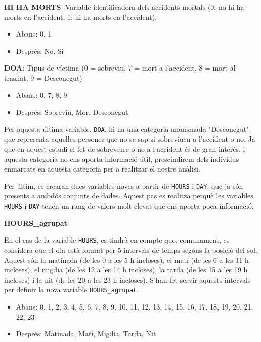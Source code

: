 \documentclass[12pt,longbibliography]{article}
\theoremstyle{definition}
\theoremstyle{remark}
\begin{document}
\textbf{HI HA MORTS}: Variable identificadora dels accidents mortals (0: no hi ha morts en l'accident, 1: hi ha morts en l'accident).


\begin{itemize}

\item Abans: 0, 1

\item  Després: No, Sí

\end{itemize}

\textbf{DOA}: Tipus de víctima (0 = sobreviu, 7 = mort a l’accident, 8 = mort al trasllat, 9 = Desconegut)

\begin{itemize}

\item  Abans: 0, 7, 8, 9

\item  Després: Sobreviu, Mor, Desconegut

\end{itemize}

Per aquesta última variable, \texttt{DOA}, hi ha una categoria anomenada "Desconegut", que representa aquelles persones que no se sap si sobreviuen a l'accident o no. Ja que en aquest estudi el fet de sobreviure o no a l'accident és de gran interès, i aquesta categoria  no ens aporta informació útil, prescindirem dels individus enmarcats en aquesta categoria per a realitzar el nostre anàlisi.

Per últim, es crearan dues variables noves a partir de \texttt{HOURS} i \texttt{DAY}, que ja són presents a ambdós conjunts de dades. Aquest pas es realitza perquè les variables \texttt{HOURS} i \texttt{DAY} tenen un rang de valors molt elevat que ens aporta poca informació. 

\textbf{HOURS\_agrupat}

En el cas de la variable \texttt{HOURS}, es tindrà en compte que, comunament, es considera que el dia està format per 5 intervals de temps segons la posició del sol. Aquest són la matinada (de les 0 a les 5 h incloses), el matí (de les 6 a les 11 h incloses), el migdia (de les 12 a les 14 h incloses), la tarda (de les 15 a les 19 h incloses) i la nit (de les 20 a les 23 h incloses). S'han fet servir aquests intervals per definir la nova variable \texttt{HOURS\_agrupat}.

\begin{itemize}

\item Abans: 0, 1, 2, 3, 4, 5, 6, 7, 8, 9, 10, 11, 12, 13, 14, 15, 16, 17, 18, 19, 20, 21, 22, 23

\item Després: Matinada, Matí, Migdia, Tarda, Nit

\end{itemize}
\end{document}
